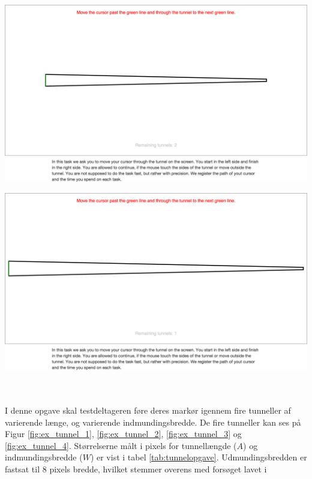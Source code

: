 \begin{minipage}{\textwidth}
\begin{minipage}{.5\textwidth}
		\label{fig:ex_tunnel_2}
	\end{minipage}
	\begin{minipage}{.5\textwidth}
		\centering
		\includegraphics[width=\textwidth, trim = .5cm 20cm .5cm 15cm, clip]{images/screenshots/ex_step_4_tunnel_3}
		\label{fig:ex_tunnel_3}
	\end{minipage}
	\begin{minipage}{.5\textwidth}
		\centering
		\includegraphics[width=\textwidth, trim = .5cm 20cm .5cm 15cm, clip]{images/screenshots/ex_step_4_tunnel_4}
		\label{fig:ex_tunnel_4}
	\end{minipage}
\end{minipage}\\\\
I denne opgave skal testdeltageren føre deres markør igennem fire tunneller af varierende længe, og varierende indmundingsbredde. De fire tunneller kan ses på Figur \ref{fig:ex_tunnel_1}, \ref{fig:ex_tunnel_2}, \ref{fig:ex_tunnel_3} og \ref{fig:ex_tunnel_4}. Størrelserne målt i pixels for tunnellængde ($A$) og indmundingsbredde ($W$) er vist i tabel \ref{tab:tunnelopgave}. Udmundingsbredden er fastsat til 8 pixels bredde, hvilket stemmer overens med forsøget lavet i \cite{accot1997}
